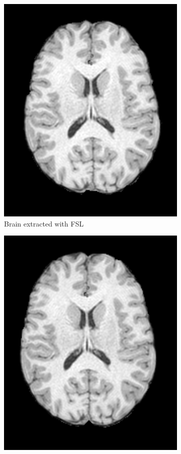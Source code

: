 \documentclass{standalone}
\begin{document}
\begin{figure}[h!]
\begin{subfigure}[b]{0.325\textwidth}
             \includegraphics[scale=0.215]{img/Chap3/FSL16.png}
             \caption{Brain extracted with FSL}
        \end{subfigure}
        \hfill
        \begin{subfigure}[b]{0.325\textwidth}
             \includegraphics[scale=0.213]{img/Chap3/BRAIN16.png}

\end{subfigure}
\end{figure}
\end{document}
